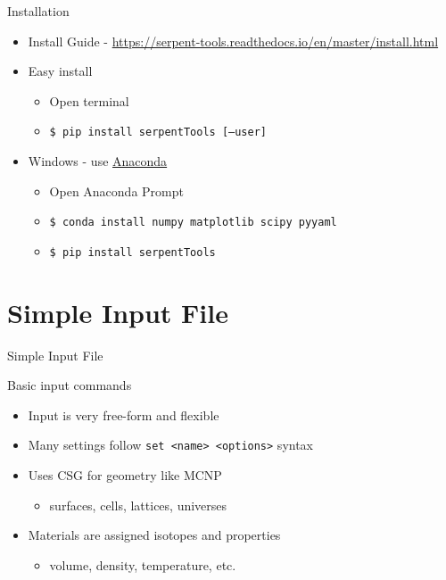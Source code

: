\documentclass{beamer}
\begin{document}
\begin{frame}{Installation}
    \begin{itemize}
        \item Install Guide - \url{https://serpent-tools.readthedocs.io/en/master/install.html}
        \item Easy install
            \begin{itemize}
                \item Open terminal
                \item \texttt{\$ pip install serpentTools [--user]}
            \end{itemize}
        \item Windows - use \href{https://www.anaconda.com/distribution/}{Anaconda}
            \begin{itemize}
                \item Open Anaconda Prompt
                \item \texttt{\$ conda install numpy matplotlib scipy pyyaml}
                \item \texttt{\$ pip install serpentTools}
            \end{itemize}
    \end{itemize}
\end{frame}

\section{Simple Input File}

\begin{frame}{Simple Input File}
    \tableofcontents[sectionstyle=show/hide,subsectionstyle=show/show/hide]
\end{frame}

\begin{frame}{Basic input commands}
    \begin{itemize}
        \item Input is very free-form and flexible
        \item Many settings follow \texttt{set <name> <options>} syntax
        \item Uses CSG for geometry like MCNP
        \begin{itemize}
            \item surfaces, cells, lattices, universes
        \end{itemize}
        \item Materials are assigned isotopes and properties
        \begin{itemize}
            \item volume, density, temperature, etc.
        \end{itemize}
    \end{itemize}
\end{frame}
\end{document}

